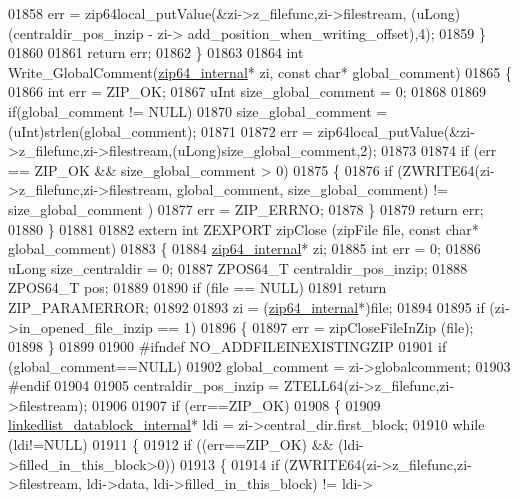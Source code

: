 \begin{DoxyCode}
01858       err = zip64local\_putValue(&zi->z\_filefunc,zi->filestream, (uLong)(centraldir\_pos\_inzip - zi->
      add\_position\_when\_writing\_offset),4);
01859   \}
01860 
01861    \textcolor{keywordflow}{return} err;
01862 \}
01863 
01864 \textcolor{keywordtype}{int} Write\_GlobalComment(\hyperlink{structzip64__internal}{zip64\_internal}* zi, \textcolor{keyword}{const} \textcolor{keywordtype}{char}* global\_comment)
01865 \{
01866   \textcolor{keywordtype}{int} err = ZIP\_OK;
01867   uInt size\_global\_comment = 0;
01868 
01869   \textcolor{keywordflow}{if}(global\_comment != NULL)
01870     size\_global\_comment = (uInt)strlen(global\_comment);
01871 
01872   err = zip64local\_putValue(&zi->z\_filefunc,zi->filestream,(uLong)size\_global\_comment,2);
01873 
01874   \textcolor{keywordflow}{if} (err == ZIP\_OK && size\_global\_comment > 0)
01875   \{
01876     \textcolor{keywordflow}{if} (ZWRITE64(zi->z\_filefunc,zi->filestream, global\_comment, size\_global\_comment) != size\_global\_comment
      )
01877       err = ZIP\_ERRNO;
01878   \}
01879   \textcolor{keywordflow}{return} err;
01880 \}
01881 
01882 \textcolor{keyword}{extern} \textcolor{keywordtype}{int} ZEXPORT zipClose (zipFile file, \textcolor{keyword}{const} \textcolor{keywordtype}{char}* global\_comment)
01883 \{
01884     \hyperlink{structzip64__internal}{zip64\_internal}* zi;
01885     \textcolor{keywordtype}{int} err = 0;
01886     uLong size\_centraldir = 0;
01887     ZPOS64\_T centraldir\_pos\_inzip;
01888     ZPOS64\_T pos;
01889 
01890     \textcolor{keywordflow}{if} (file == NULL)
01891         \textcolor{keywordflow}{return} ZIP\_PARAMERROR;
01892 
01893     zi = (\hyperlink{structzip64__internal}{zip64\_internal}*)file;
01894 
01895     \textcolor{keywordflow}{if} (zi->in\_opened\_file\_inzip == 1)
01896     \{
01897         err = zipCloseFileInZip (file);
01898     \}
01899 
01900 \textcolor{preprocessor}{#ifndef NO\_ADDFILEINEXISTINGZIP}
01901     \textcolor{keywordflow}{if} (global\_comment==NULL)
01902         global\_comment = zi->globalcomment;
01903 \textcolor{preprocessor}{#endif}
01904 
01905     centraldir\_pos\_inzip = ZTELL64(zi->z\_filefunc,zi->filestream);
01906 
01907     \textcolor{keywordflow}{if} (err==ZIP\_OK)
01908     \{
01909         \hyperlink{structlinkedlist__datablock__internal__s}{linkedlist\_datablock\_internal}* ldi = zi->central\_dir.first\_block;
01910         \textcolor{keywordflow}{while} (ldi!=NULL)
01911         \{
01912             \textcolor{keywordflow}{if} ((err==ZIP\_OK) && (ldi->filled\_in\_this\_block>0))
01913             \{
01914                 \textcolor{keywordflow}{if} (ZWRITE64(zi->z\_filefunc,zi->filestream, ldi->data, ldi->filled\_in\_this\_block) != ldi->

\end{DoxyCode}
